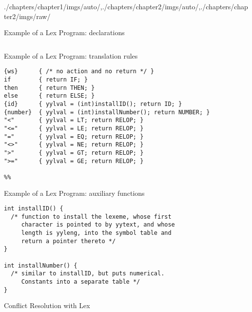 \begin{graphicspathcontext}{{./chapters/chapter1/imgs/auto/},{./chapters/chapter2/imgs/auto/},{./chapters/chapter2/imgs/raw/}}
\begin{bibunit}[apalike]
\begin{frame}[fragile,background=6]{{Example of a Lex Program:} declarations}
\begin{lstlisting}[style=lststyle-c]
%%
	\end{lstlisting}
\end{frame}

\begin{frame}[fragile,background=6]{{Example of a Lex Program:} translation rules}
	\begin{lstlisting}[style=lststyle-c]
{ws}      { /* no action and no return */ }
if        { return IF; }
then      { return THEN; }
else      { return ELSE; }
{id}      { yylval = (int)installID(); return ID; }
{number}  { yylval = (int)installNumber(); return NUMBER; }
"<"       { yylval = LT; return RELOP; }
"<="      { yylval = LE; return RELOP; }
"="       { yylval = EQ; return RELOP; }
"<>"      { yylval = NE; return RELOP; }
">"       { yylval = GT; return RELOP; }
">="      { yylval = GE; return RELOP; }

%%
	\end{lstlisting}
\end{frame}

\begin{frame}[fragile,background=6]{{Example of a Lex Program:} auxiliary functions}
	\begin{lstlisting}[style=lststyle-c]
int installID() {
  /* function to install the lexeme, whose first
     character is pointed to by yytext, and whose
     length is yyleng, into the symbol table and
     return a pointer thereto */
}

int installNumber() {
  /* similar to installID, but puts numerical.
     Constants into a separate table */
}
	\end{lstlisting}
\end{frame}

\begin{frame}{{Conflict Resolution} with Lex}
	\begin{center}
		\hspace{1cm}
	\end{center}
\end{frame}


\end{bibunit}
\end{graphicspathcontext}
